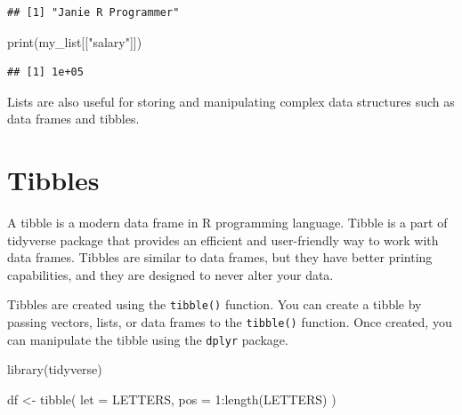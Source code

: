 \documentclass[
]{book}
\newenvironment{Shaded}{\begin{snugshade}}{\end{snugshade}}
\newcommand{\AttributeTok}[1]{\textcolor[rgb]{0.77,0.63,0.00}{#1}}
\newcommand{\CommentTok}[1]{\textcolor[rgb]{0.56,0.35,0.01}{\textit{#1}}}
\newcommand{\DecValTok}[1]{\textcolor[rgb]{0.00,0.00,0.81}{#1}}
\newcommand{\FunctionTok}[1]{\textcolor[rgb]{0.00,0.00,0.00}{#1}}
\newcommand{\NormalTok}[1]{#1}
\newcommand{\OtherTok}[1]{\textcolor[rgb]{0.56,0.35,0.01}{#1}}
\newcommand{\SpecialCharTok}[1]{\textcolor[rgb]{0.00,0.00,0.00}{#1}}
\newcommand{\StringTok}[1]{\textcolor[rgb]{0.31,0.60,0.02}{#1}}
\begin{document}
\begin{Shaded}
\end{Shaded}

\begin{verbatim}
## [1] "Janie R Programmer"
\end{verbatim}

\begin{Shaded}
\begin{Highlighting}[]
\FunctionTok{print}\NormalTok{(my\_list[[}\StringTok{"salary"}\NormalTok{]])}
\end{Highlighting}
\end{Shaded}

\begin{verbatim}
## [1] 1e+05
\end{verbatim}

Lists are also useful for storing and manipulating complex data structures such as data frames and tibbles.

\hypertarget{tibbles}{%
\section{Tibbles}\label{tibbles}}

A tibble is a modern data frame in R programming language. Tibble is a part of tidyverse package that provides an efficient and user-friendly way to work with data frames. Tibbles are similar to data frames, but they have better printing capabilities, and they are designed to never alter your data.

Tibbles are created using the \texttt{tibble()} function. You can create a tibble by passing vectors, lists, or data frames to the \texttt{tibble()} function. Once created, you can manipulate the tibble using the \texttt{dplyr} package.

\begin{Shaded}
\begin{Highlighting}[]
\FunctionTok{library}\NormalTok{(tidyverse)}

\NormalTok{df }\OtherTok{\textless{}{-}} \FunctionTok{tibble}\NormalTok{(}
  \AttributeTok{let =}\NormalTok{ LETTERS,}
  \AttributeTok{pos =} \DecValTok{1}\SpecialCharTok{:}\FunctionTok{length}\NormalTok{(LETTERS)}
\NormalTok{)}
\end{Highlighting}
\end{Shaded}
\end{document}
